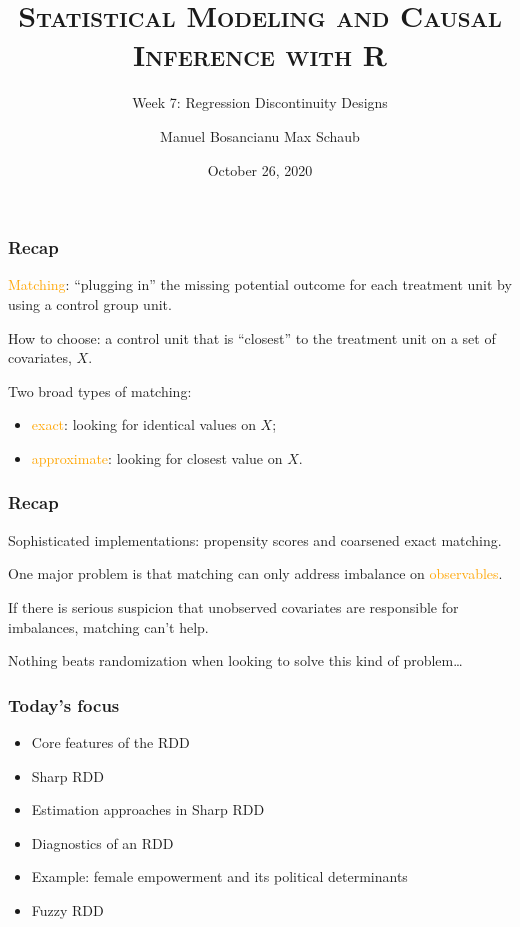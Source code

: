 \documentclass[12pt,english,dvipsnames,aspectratio=169,handout]{beamer}\usepackage[]{graphicx}\usepackage[]{xcolor}
\title{\textsc{Statistical Modeling and Causal Inference with R}}
\subtitle{Week 7: Regression Discontinuity Designs}
\date{October 26, 2020}
\author{Manuel Bosancianu \hfill Max Schaub}
\institute{Hertie School of Governance}
\begin{document}
\maketitle




\begin{frame}
	\frametitle{Recap}
	\textcolor{orange}{Matching}: ``plugging in'' the missing potential outcome for each treatment unit by using a control group unit.\bigskip
	\pause
	
	How to choose: a control unit that is ``closest'' to the treatment unit on a set of covariates, $X$.\bigskip
	\pause
	
	Two broad types of matching:
	
	\begin{itemize}
	\item \textcolor{orange}{exact}: looking for identical values on $X$;
	\pause
	\item \textcolor{orange}{approximate}: looking for closest value on $X$.
	\end{itemize}
	
\end{frame}


\begin{frame}
	\frametitle{Recap}
  Sophisticated implementations: propensity scores and coarsened exact matching.\bigskip
  \pause
  
  One major problem is that matching can only address imbalance on \textcolor{orange}{observables}.\bigskip
  
  If there is serious suspicion that unobserved covariates are responsible for imbalances, matching can't help.\bigskip
  \pause
  
  Nothing beats randomization when looking to solve this kind of problem\dots
	
\end{frame}


\begin{frame}
	\frametitle{Today's focus}
	
	\begin{itemize}
		\setlength\itemsep{1.5em}
		\item Core features of the RDD
		\item Sharp RDD
		\item Estimation approaches in Sharp RDD
		\item Diagnostics of an RDD
		\item Example: female empowerment and its political determinants
		\item Fuzzy RDD
	\end{itemize}
\end{frame}
\end{document}

